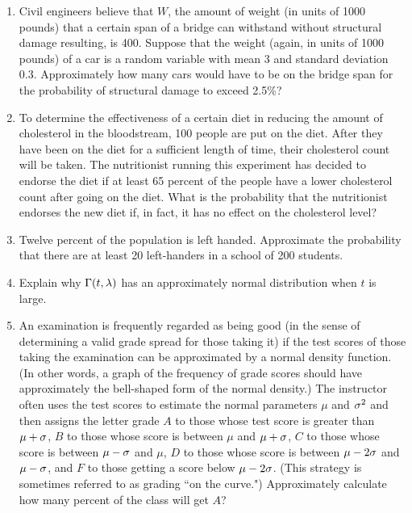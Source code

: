 \documentclass[12pt]{article}%
\newcommand{\0}{{\bf 0}}
\begin{document}
\begin{enumerate}
\item
Civil engineers believe that $W$, the amount of weight (in units of 1000 pounds) that a certain span of a bridge can withstand without structural damage resulting, is 400. Suppose that the weight (again, in units of 1000 pounds) of a car is a random variable with mean 3 and standard deviation 0.3. Approximately how many cars would have to be on the bridge span for the probability of structural damage to exceed 2.5\%?







\item
To determine the effectiveness of a certain diet in reducing the amount of cholesterol in the bloodstream, 100 people are put on the diet. After they have been on the diet for a sufficient length of time, their cholesterol count will be taken. The nutritionist running this experiment has decided to endorse the diet if at least 65 percent of the people have a lower cholesterol count after going on the diet. What is the probability that the nutritionist endorses the new diet if, in fact, it has no effect on the cholesterol level?





\item
Twelve percent of the population is left handed. Approximate the probability that there are at least 20 left-handers in a school of 200 students. 



\item
Explain why $\Gamma(t, \lambda)$ has an approximately normal distribution when $t$ is large.



\item
An examination is frequently regarded as being good (in the sense of determining a valid grade spread for those taking it) if the test scores of those taking the examination can be approximated by a normal density function. (In other words, a graph of the frequency of grade scores should have approximately the bell-shaped form of the normal density.) The instructor often uses the test scores to estimate the normal parameters $\mu$ and $\sigma^2$ and then assigns the letter grade 
$A$ to those whose test score is greater than $\mu+\sigma$,
$B$ to those whose score is between $\mu$ and $\mu+\sigma$,
$C$ to those whose score is between $\mu-\sigma$ and $\mu$,
$D$ to those whose score is between $\mu-2\sigma$ and $\mu-\sigma$, and 
$F$ to those getting a score below $\mu-2\sigma$. 
(This strategy is sometimes referred to as grading ``on the curve.") 
Approximately calculate how many percent of the class will get $A$?




\end{enumerate}
\end{document}
